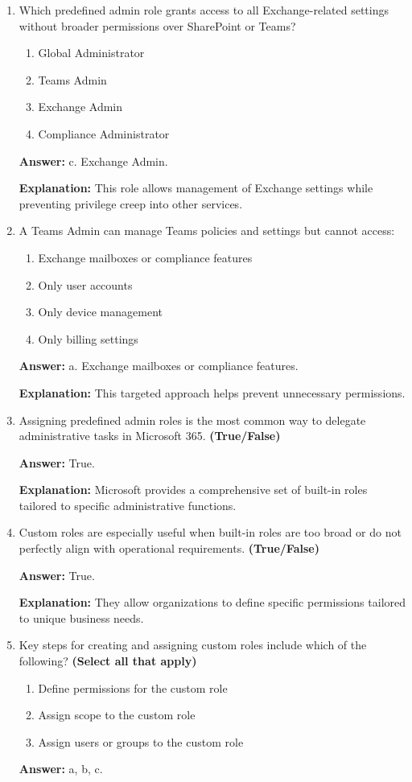 \documentclass[10pt]{article}
\begin{document}
\begin{enumerate}[leftmargin=*]
\item Which predefined admin role grants access to all Exchange-related settings without broader permissions over SharePoint or Teams?
\begin{enumerate}[label=\alph*., leftmargin=1.5em]
\item Global Administrator
\item Teams Admin
\item Exchange Admin
\item Compliance Administrator
\end{enumerate}
\textbf{Answer:} c. Exchange Admin.

\textbf{Explanation:} This role allows management of Exchange settings while preventing privilege creep into other services.

\item A Teams Admin can manage Teams policies and settings but cannot access:
\begin{enumerate}[label=\alph*., leftmargin=1.5em]
\item Exchange mailboxes or compliance features
\item Only user accounts
\item Only device management
\item Only billing settings
\end{enumerate}
\textbf{Answer:} a. Exchange mailboxes or compliance features.

\textbf{Explanation:} This targeted approach helps prevent unnecessary permissions.

\item Assigning predefined admin roles is the most common way to delegate administrative tasks in Microsoft 365. \textbf{(True/False)}

\textbf{Answer:} True.

\textbf{Explanation:} Microsoft provides a comprehensive set of built-in roles tailored to specific administrative functions.

\item Custom roles are especially useful when built-in roles are too broad or do not perfectly align with operational requirements. \textbf{(True/False)}

\textbf{Answer:} True.

\textbf{Explanation:} They allow organizations to define specific permissions tailored to unique business needs.

\item Key steps for creating and assigning custom roles include which of the following? \textbf{(Select all that apply)}
\begin{enumerate}[label=\alph*., leftmargin=1.5em]
\item Define permissions for the custom role
\item Assign scope to the custom role
\item Assign users or groups to the custom role
\end{enumerate}
\textbf{Answer:} a, b, c.


\end{enumerate}
\end{document}
